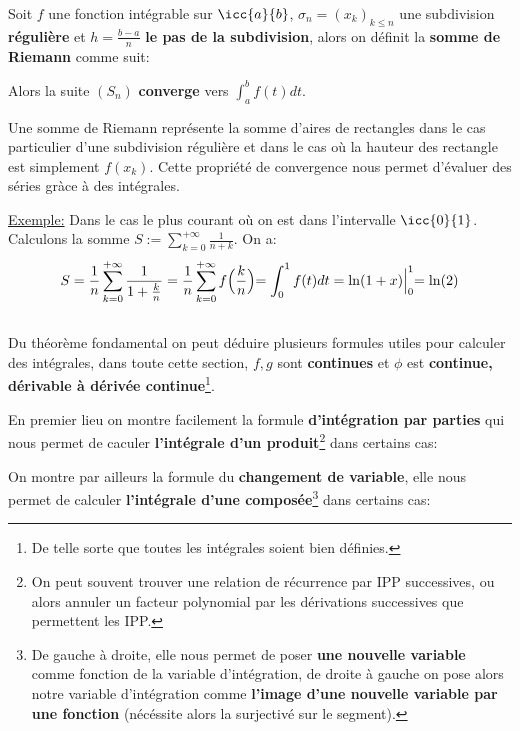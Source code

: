 Soit \(f\) une fonction intégrable sur \(\icc{a}{b}\), \(\sigma_n = (x_k)_{k \leq n}\) une subdivision \textbf{régulière} et \(h = \frac{b - a}{n}\) \textbf{le pas de la subdivision}, alors on définit la \textbf{somme de Riemann} comme suit:

Alors la suite \((S_n)\) \textbf{converge} vers \(\int_{a}^{b} f(t) d t\).\<

Une somme de Riemann représente la somme d'aires de rectangles dans le cas particulier d'une subdivision régulière et dans le cas où la hauteur des rectangle est simplement \(f(x_k)\). Cette propriété de convergence nous permet d'évaluer des séries gràce à des intégrales.\<

\underline{Exemple:} Dans le cas le plus courant où on est dans l'intervalle \(\icc{0}{1}\). Calculons la somme \(S := \sum_{k=0}^{+\infty} \frac{1}{n + k}\). On a:
\[
   S =  \frac{1}{n}\sum_{k=0}^{+\infty} \frac{1}{1 + \frac{k}{n}} = \frac{1}{n}\sum_{k=0}^{+\infty} f\Bigl(\frac{k}{n}\Bigl) = \int_{0}^{1} f(t) d t = \ln(1 + x) \Bigl|_{0}^{1} = \ln(2)
\]
\subsection*{}

Du théorème fondamental on peut déduire plusieurs formules utiles pour calculer des intégrales, dans toute cette section, \(f, g\) sont \textbf{continues} et \(\phi\) est \textbf{continue, dérivable à dérivée continue}\footnote[3]{De telle sorte que toutes les intégrales soient bien définies.}.\< 

En premier lieu on montre facilement la formule \textbf{d'intégration par parties} qui nous permet de caculer \textbf{l'intégrale d'un produit}\footnote[4]{On peut souvent trouver une relation de récurrence par IPP successives, ou alors annuler un facteur polynomial par les dérivations successives que permettent les IPP.} dans certains cas:

On montre par ailleurs la formule du \textbf{changement de variable}, elle nous permet de calculer \textbf{l'intégrale d'une composée}\footnote[5]{De gauche à droite, elle nous permet de poser \textbf{une nouvelle variable} comme fonction de la variable d'intégration, de droite à gauche on pose alors notre variable d'intégration comme \textbf{l'image d'une nouvelle variable par une fonction} (nécéssite alors la surjectivé sur le segment).} dans certains cas:
